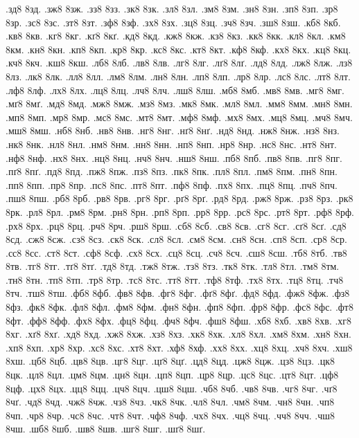 {.зд8
8зд.
.зж8
8зж.
.зз8
8зз.
.зк8
8зк.
.зл8
8зл.
.зм8
8зм.
.зн8
8зн.
.зп8
8зп.
.зр8
8зр.
.зс8
8зс.
.зт8
8зт.
.зф8
8зф.
.зх8
8зх.
.зц8
8зц.
.зч8
8зч.
.зш8
8зш.
.кб8
8кб.
.кв8
8кв.
.кг8
8кг.
.кґ8
8кґ.
.кд8
8кд.
.кж8
8кж.
.кз8
8кз.
.кк8
8кк.
.кл8
8кл.
.км8
8км.
.кн8
8кн.
.кп8
8кп.
.кр8
8кр.
.кс8
8кс.
.кт8
8кт.
.кф8
8кф.
.кх8
8кх.
.кц8
8кц.
.кч8
8кч.
.кш8
8кш.
.лб8
8лб.
.лв8
8лв.
.лг8
8лг.
.лґ8
8лґ.
.лд8
8лд.
.лж8
8лж.
.лз8
8лз.
.лк8
8лк.
.лл8
8лл.
.лм8
8лм.
.лн8
8лн.
.лп8
8лп.
.лр8
8лр.
.лс8
8лс.
.лт8
8лт.
.лф8
8лф.
.лх8
8лх.
.лц8
8лц.
.лч8
8лч.
.лш8
8лш.
.мб8
8мб.
.мв8
8мв.
.мг8
8мг.
.мґ8
8мґ.
.мд8
8мд.
.мж8
8мж.
.мз8
8мз.
.мк8
8мк.
.мл8
8мл.
.мм8
8мм.
.мн8
8мн.
.мп8
8мп.
.мр8
8мр.
.мс8
8мс.
.мт8
8мт.
.мф8
8мф.
.мх8
8мх.
.мц8
8мц.
.мч8
8мч.
.мш8
8мш.
.нб8
8нб.
.нв8
8нв.
.нг8
8нг.
.нґ8
8нґ.
.нд8
8нд.
.нж8
8нж.
.нз8
8нз.
.нк8
8нк.
.нл8
8нл.
.нм8
8нм.
.нн8
8нн.
.нп8
8нп.
.нр8
8нр.
.нс8
8нс.
.нт8
8нт.
.нф8
8нф.
.нх8
8нх.
.нц8
8нц.
.нч8
8нч.
.нш8
8нш.
.пб8
8пб.
.пв8
8пв.
.пг8
8пг.
.пґ8
8пґ.
.пд8
8пд.
.пж8
8пж.
.пз8
8пз.
.пк8
8пк.
.пл8
8пл.
.пм8
8пм.
.пн8
8пн.
.пп8
8пп.
.пр8
8пр.
.пс8
8пс.
.пт8
8пт.
.пф8
8пф.
.пх8
8пх.
.пц8
8пц.
.пч8
8пч.
.пш8
8пш.
.рб8
8рб.
.рв8
8рв.
.рг8
8рг.
.рґ8
8рґ.
.рд8
8рд.
.рж8
8рж.
.рз8
8рз.
.рк8
8рк.
.рл8
8рл.
.рм8
8рм.
.рн8
8рн.
.рп8
8рп.
.рр8
8рр.
.рс8
8рс.
.рт8
8рт.
.рф8
8рф.
.рх8
8рх.
.рц8
8рц.
.рч8
8рч.
.рш8
8рш.
.сб8
8сб.
.св8
8св.
.сг8
8сг.
.сґ8
8сґ.
.сд8
8сд.
.сж8
8сж.
.сз8
8сз.
.ск8
8ск.
.сл8
8сл.
.см8
8см.
.сн8
8сн.
.сп8
8сп.
.ср8
8ср.
.сс8
8сс.
.ст8
8ст.
.сф8
8сф.
.сх8
8сх.
.сц8
8сц.
.сч8
8сч.
.сш8
8сш.
.тб8
8тб.
.тв8
8тв.
.тг8
8тг.
.тґ8
8тґ.
.тд8
8тд.
.тж8
8тж.
.тз8
8тз.
.тк8
8тк.
.тл8
8тл.
.тм8
8тм.
.тн8
8тн.
.тп8
8тп.
.тр8
8тр.
.тс8
8тс.
.тт8
8тт.
.тф8
8тф.
.тх8
8тх.
.тц8
8тц.
.тч8
8тч.
.тш8
8тш.
.фб8
8фб.
.фв8
8фв.
.фг8
8фг.
.фґ8
8фґ.
.фд8
8фд.
.фж8
8фж.
.фз8
8фз.
.фк8
8фк.
.фл8
8фл.
.фм8
8фм.
.фн8
8фн.
.фп8
8фп.
.фр8
8фр.
.фс8
8фс.
.фт8
8фт.
.фф8
8фф.
.фх8
8фх.
.фц8
8фц.
.фч8
8фч.
.фш8
8фш.
.хб8
8хб.
.хв8
8хв.
.хг8
8хг.
.хґ8
8хґ.
.хд8
8хд.
.хж8
8хж.
.хз8
8хз.
.хк8
8хк.
.хл8
8хл.
.хм8
8хм.
.хн8
8хн.
.хп8
8хп.
.хр8
8хр.
.хс8
8хс.
.хт8
8хт.
.хф8
8хф.
.хх8
8хх.
.хц8
8хц.
.хч8
8хч.
.хш8
8хш.
.цб8
8цб.
.цв8
8цв.
.цг8
8цг.
.цґ8
8цґ.
.цд8
8цд.
.цж8
8цж.
.цз8
8цз.
.цк8
8цк.
.цл8
8цл.
.цм8
8цм.
.цн8
8цн.
.цп8
8цп.
.цр8
8цр.
.цс8
8цс.
.цт8
8цт.
.цф8
8цф.
.цх8
8цх.
.цц8
8цц.
.цч8
8цч.
.цш8
8цш.
.чб8
8чб.
.чв8
8чв.
.чг8
8чг.
.чґ8
8чґ.
.чд8
8чд.
.чж8
8чж.
.чз8
8чз.
.чк8
8чк.
.чл8
8чл.
.чм8
8чм.
.чн8
8чн.
.чп8
8чп.
.чр8
8чр.
.чс8
8чс.
.чт8
8чт.
.чф8
8чф.
.чх8
8чх.
.чц8
8чц.
.чч8
8чч.
.чш8
8чш.
.шб8
8шб.
.шв8
8шв.
.шг8
8шг.
.шґ8
8шґ.
}
